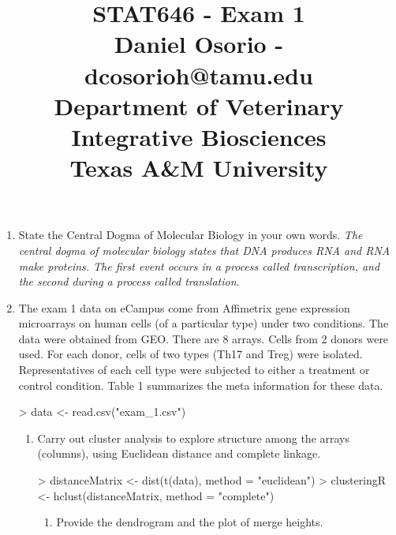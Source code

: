 \documentclass[12pt,a4paper]{paper}
\begin{document}
\title{STAT646 - Exam 1\\\small{Daniel Osorio - dcosorioh@tamu.edu\\Department of Veterinary Integrative Biosciences\\Texas A\&M University}}
\maketitle

\begin{enumerate}
\item State the Central Dogma of Molecular Biology in your own words. \textit{The central dogma of molecular biology states that DNA produces RNA and RNA make proteins.  The first event occurs in a process called transcription, and the second during a process called translation.}
\item The exam 1 data on eCampus come from Affimetrix gene expression microarrays on human cells (of a particular type) under two conditions. The data were obtained from GEO. There are 8 arrays. Cells from 2 donors were used. For each donor, cells of two types (Th17 and Treg) were isolated. Representatives of each cell type were subjected to either a treatment or control condition. Table 1 summarizes the meta information for these data.
\begin{Schunk}
\begin{Sinput}
> data <- read.csv("exam_1.csv")
\end{Sinput}
\end{Schunk}
\begin{enumerate}
\item Carry out cluster analysis to explore structure among the arrays (columns), using Euclidean distance and complete linkage.
\begin{Schunk}
\begin{Sinput}
> distanceMatrix <- dist(t(data), method = "euclidean")
> clusteringR <- hclust(distanceMatrix, method = "complete")
\end{Sinput}
\end{Schunk}
\begin{enumerate}
\item Provide the dendrogram and the plot of merge heights.
\begin{Schunk}
\end{Schunk}
\end{enumerate}
\end{enumerate}
\end{enumerate}
\end{document}
